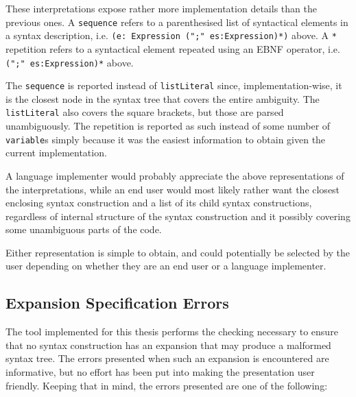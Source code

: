 \documentclass{kththesis}
\begin{document}
These interpretations expose rather more implementation details than the previous ones. A \texttt{sequence} refers to a parenthesised list of syntactical elements in a syntax description, i.e. \texttt{(e: Expression (";" es:Expression)*)} above. A \texttt{*} repetition refers to a syntactical element repeated using an EBNF operator, i.e. \texttt{(";" es:Expression)*} above.

The \texttt{sequence} is reported instead of \texttt{listLiteral} since, implementation-wise, it is the closest node in the syntax tree that covers the entire ambiguity. The \texttt{listLiteral} also covers the square brackets, but those are parsed unambiguously. The repetition is reported as such instead of some number of \texttt{variable}s simply because it was the easiest information to obtain given the current implementation.

A language implementer would probably appreciate the above representations of the interpretations, while an end user would most likely rather want the closest enclosing syntax construction and a list of its child syntax constructions, regardless of internal structure of the syntax construction and it possibly covering some unambiguous parts of the code.

Either representation is simple to obtain, and could potentially be selected by the user depending on whether they are an end user or a language implementer.

\subsection{Expansion Specification Errors}

The tool implemented for this thesis performs the checking necessary to ensure that no syntax construction has an expansion that may produce a malformed syntax tree. The errors presented when such an expansion is encountered are informative, but no effort has been put into making the presentation user friendly. Keeping that in mind, the errors presented are one of the following:
\end{document}
